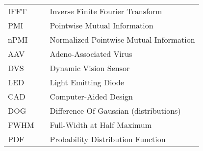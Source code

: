 \begin{center}
\begin{tabular}{lll}
      IFFT               & \dotfill      & Inverse Finite Fourier Transform \\
      PMI               & \dotfill      & Pointwise Mutual Information  \\
      nPMI               & \dotfill      & Normalized Pointwise Mutual Information  \\
      AAV               & \dotfill      & Adeno-Associated Virus  \\
      DVS               & \dotfill      & Dynamic Vision Sensor \\
      LED               & \dotfill      & Light Emitting Diode  \\
        CAD              & \dotfill      & Computer-Aided Design                  \\
        DOG              & \dotfill      & Difference Of Gaussian (distributions) \\
        FWHM             & \dotfill      & Full-Width at Half Maximum             \\
        PDF              & \dotfill      & Probability Distribution Function      \\
    \end{tabular}
\end{center}

